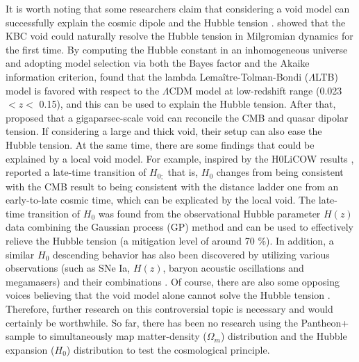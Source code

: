 \documentclass{aa}
\begin{document}
It is worth noting that some researchers claim that considering a void model can successfully explain the cosmic dipole and the Hubble tension \citep{2020A&A...633A..19B,2020MNRAS.499.2845H,2020MNRAS.491.2075L,2022CQGra..39r4001C,2022arXiv221106857C,2023MNRAS.525.3274M}. \citet{2020MNRAS.499.2845H} showed that the KBC void \citep{2013ApJ...775...62K} could naturally resolve the Hubble tension in Milgromian dynamics for the first time. By computing the Hubble constant in an inhomogeneous universe and adopting model selection via both the Bayes factor and the Akaike information criterion, \citet{2022CQGra..39r4001C} found that the lambda Lemaître-Tolman-Bondi ($\Lambda$LTB) model is favored with respect to the $\Lambda$CDM model at low-redshift range (0.023 $< z <$ 0.15), and this can be used to explain the Hubble tension. After that, \citet{2022arXiv221106857C} proposed that a gigaparsec-scale void can reconcile the CMB and quasar dipolar tension. If considering a large and thick void, their setup can also ease the Hubble tension. At the same time, there are some findings that could be explained by a local void model. For example, inspired by the H0LiCOW results \citep{2020A&A...639A.101M,2020MNRAS.498.1420W}, \citet{2022MNRAS.517..576H} reported a late-time transition of $H_{0;}$ that is, $H_{0}$ changes from being consistent with the CMB result to being consistent with the distance ladder one from an early-to-late cosmic time, which can be explicated by the local void. The late-time transition of $H_{0}$ was found from the observational Hubble parameter $H(z)$ data combining the Gaussian process (GP) method \citep{2011JMLR...12.2825P} and can be used to effectively relieve the Hubble tension (a mitigation level of around 70 \%). In addition, a similar $H_{0}$ descending behavior has also been discovered by utilizing various observations (such as SNe Ia, $H(z)$, baryon acoustic oscillations and megamasers) and their combinations \citep{2020PhRvD.102j3525K,2021PhRvD.103j3509K,2022Galax..10...24D,2022PhRvD.106d1301O,2022A&A...668A..34H,2022arXiv220611447C,2023A&A...674A..45J,2023arXiv230112725M}. Of course, there are also some opposing voices believing that the void model alone cannot solve the Hubble tension \citep{2019ApJ...875..145K,2021PhRvD.103l3539C,2022JCAP...07..003C}. Therefore, further research on this controversial topic is necessary and would certainly be worthwhile. So far, there has been no research using the Pantheon+ sample to simultaneously map matter-density ($\Omega_{m}$) distribution and the Hubble expansion ($H_{0}$) distribution to test the cosmological principle.
 
\end{document}
